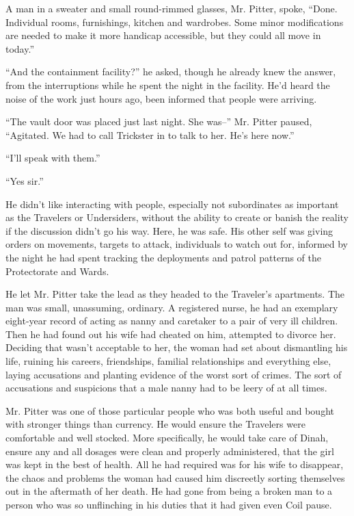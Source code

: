 A man in a sweater and small round-rimmed glasses, Mr. Pitter, spoke, ``Done.  Individual rooms, furnishings, kitchen and wardrobes.  Some minor modifications are needed to make it more handicap accessible, but they could all move in today.''



``And the containment facility?'' he asked, though he already knew the answer, from the interruptions while he spent the night in the facility.  He'd heard the noise of the work just hours ago, been informed that people were arriving.



``The vault door was placed just last night.  She was--'' Mr. Pitter paused, ``Agitated.  We had to call Trickster in to talk to her.  He's here now.''



``I'll speak with them.''



``Yes sir.''



He didn't like interacting with people, especially not subordinates as important as the Travelers or Undersiders, without the ability to create or banish the reality if the discussion didn't go his way.  Here, he was safe.  His other self was giving orders on movements, targets to attack, individuals to watch out for, informed by the night he had spent tracking the deployments and patrol patterns of the Protectorate and Wards.



He let Mr. Pitter take the lead as they headed to the Traveler's apartments.  The man was small, unassuming, ordinary.  A registered nurse, he had an exemplary eight-year record of acting as nanny and caretaker to a pair of very ill children.  Then he had found out his wife had cheated on him, attempted to divorce her.  Deciding that wasn't acceptable to her, the woman had set about dismantling his life, ruining his careers, friendships, familial relationships and everything else, laying accusations and planting evidence of the worst sort of crimes.  The sort of accusations and suspicions that a male nanny had to be leery of at all times.



Mr. Pitter was one of those particular people who was both useful and bought with stronger things than currency.  He would ensure the Travelers were comfortable and well stocked.  More specifically, he would take care of Dinah, ensure any and all dosages were clean and properly administered, that the girl was kept in the best of health.  All he had required was for his wife to disappear, the chaos and problems the woman had caused him discreetly sorting themselves out in the aftermath of her death.  He had gone from being a broken man to a person who was so unflinching in his duties that it had given even Coil pause.




